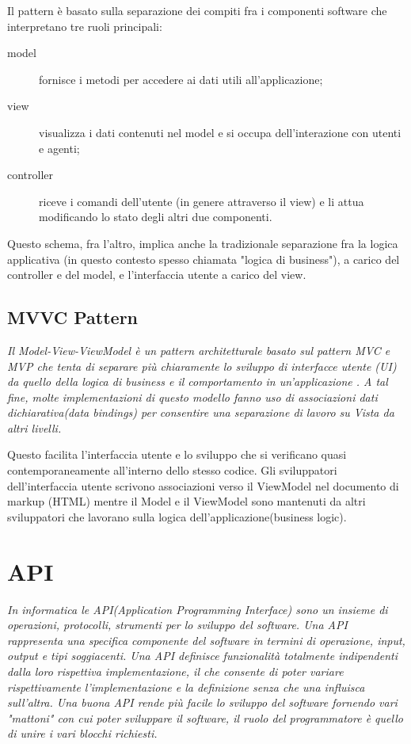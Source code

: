 Il pattern è basato sulla separazione dei compiti fra i componenti software che interpretano tre ruoli principali:
\begin{description}
\item[model] fornisce i metodi per accedere ai dati utili all'applicazione;
\item[view] visualizza i dati contenuti nel model e si occupa dell'interazione con utenti e agenti;
\item[controller] riceve i comandi dell'utente (in genere attraverso il view) e li attua modificando lo stato degli altri due componenti.
\end{description}
Questo schema, fra l'altro, implica anche la tradizionale separazione fra la logica applicativa (in questo contesto spesso chiamata "logica di business"), a carico del controller e del model, e l'interfaccia utente a carico del view.
\hspace*{\fill}\cite{wiki:mvc}

\subsection{MVVC Pattern}
\emph{Il Model-View-ViewModel è un pattern architetturale basato sul pattern MVC e MVP che tenta di separare più chiaramente lo sviluppo di interfacce utente (UI) da quello della logica di business e il comportamento in un'applicazione . A tal fine, molte implementazioni di questo modello fanno uso di associazioni dati dichiarativa(data bindings) per consentire una separazione di lavoro su Vista da altri livelli.}

Questo facilita l'interfaccia utente e lo sviluppo che si verificano quasi contemporaneamente all'interno dello stesso codice. Gli sviluppatori dell'interfaccia utente scrivono associazioni verso il ViewModel nel documento di markup (HTML) mentre il Model e il ViewModel sono mantenuti da altri sviluppatori che lavorano sulla logica dell'applicazione(business logic).

\hspace*{\fill}\cite{book:mvvm}
\section{API}

\emph{In informatica le API(Application Programming Interface) sono un insieme di operazioni, protocolli, strumenti per lo sviluppo del software. Una API rappresenta una specifica componente del software in termini di operazione, input, output e tipi soggiacenti. Una API definisce funzionalità totalmente indipendenti dalla loro rispettiva implementazione, il che consente di poter variare rispettivamente l'implementazione e la definizione senza che una influisca sull'altra. Una buona API rende più facile lo sviluppo del software fornendo vari "mattoni" con cui poter sviluppare il software, il ruolo del programmatore è quello di unire i vari blocchi richiesti.}
\hspace*{\fill}\cite{wiki:api}

